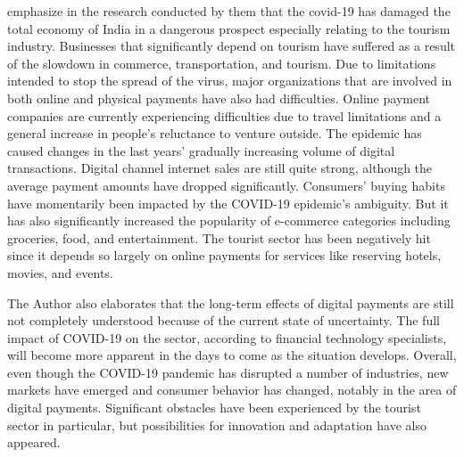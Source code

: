 \documentclass[12pt]{article}
\begin{document}
\citep{kumar2020social} emphasize in the research conducted by them that the covid-19 has damaged the total economy of India in a dangerous prospect especially relating to the tourism industry. Businesses that significantly depend on tourism have suffered as a result of the slowdown in commerce, transportation, and tourism. Due to limitations intended to stop the spread of the virus, major organizations that are involved in both online and physical payments have also had difficulties. Online payment companies are currently experiencing difficulties due to travel limitations and a general increase in people's reluctance to venture outside. The epidemic has caused changes in the last years' gradually increasing volume of digital transactions. Digital channel internet sales are still quite strong, although the average payment amounts have dropped significantly. Consumers' buying habits have momentarily been impacted by the COVID-19 epidemic's ambiguity. But it has also significantly increased the popularity of e-commerce categories including groceries, food, and entertainment. The tourist sector has been negatively hit since it depends so largely on online payments for services like reserving hotels, movies, and events. 

The Author also elaborates that the long-term effects of digital payments are still not completely understood because of the current state of uncertainty. The full impact of COVID-19 on the sector, according to financial technology specialists, will become more apparent in the days to come as the situation develops. Overall, even though the COVID-19 pandemic has disrupted a number of industries, new markets have emerged and consumer behavior has changed, notably in the area of digital payments. Significant obstacles have been experienced by the tourist sector in particular, but possibilities for innovation and adaptation have also appeared.
\end{document}
